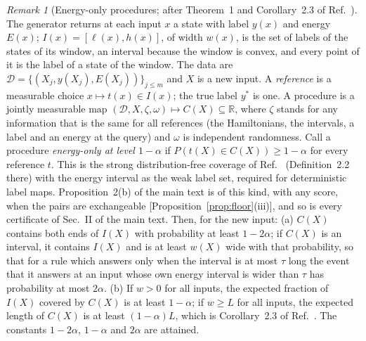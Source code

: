 \documentclass[aps,prx,onecolumn,10pt,nofootinbib,longbibliography,floatfix]{revtex4-2}
\theoremstyle{remark}
\newtheorem*{remark}{Remark}
\begin{document}
\begin{remark}[Energy-only procedures; after Theorem~1 and Corollary~2.3 of Ref.~\cite{cauchois2022}] %
\label{rem:anyproc}
The generator returns at each input $x$ a state with label $y(x)$ and energy $E(x)$; $I(x)=[\ell(x),h(x)]$, of width
$w(x)$, is the set of labels of the states of its window, an interval because the window is convex, and every point
of it is the label of a state of the window. The data are $\mathcal D=\{(X_j,y(X_j),E(X_j))\}_{j\le m}$ and $X$ is
a new input. A \emph{reference} is a measurable choice $x\mapsto t(x)\in I(x)$; the true label $y^*$ is one. A
procedure is a jointly measurable map $(\mathcal D,X,\zeta,\omega)\mapsto C(X)\subseteq\mathbb R$, where $\zeta$
stands for any information that is the same for all references (the Hamiltonians, the intervals, a label and an
energy at the query) and $\omega$ is independent randomness. Call a procedure \emph{energy-only at level
$1-\alpha$} if $P(t(X)\in C(X))\ge1-\alpha$ for every reference $t$. This is the strong distribution-free coverage
of Ref.~\cite{cauchois2022} (Definition~2.2 there) with the energy interval as the weak label set, required for %
deterministic label maps. Proposition~2(b) of the main text is of this kind, with any score, when the pairs are %
exchangeable [Proposition~\ref{prop:floor}(iii)], and so is every certificate of Sec.~II of the main text. Then,
for the new input:
(a) $C(X)$ contains both ends of $I(X)$ with probability at least $1-2\alpha$; if $C(X)$ is an interval, it
contains $I(X)$ and is at least $w(X)$ wide with that probability, so that for a rule which answers only when the
interval is at most $\tau$ long the event that it answers at an input whose own energy interval is wider than $\tau$
has probability at most $2\alpha$.
(b) If $w>0$ for all inputs, the expected fraction of $I(X)$ covered by $C(X)$ is at least $1-\alpha$; if $w\ge L$
for all inputs, the expected length of $C(X)$ is at least $(1-\alpha)L$, which is Corollary~2.3 of %
Ref.~\cite{cauchois2022}. The constants $1-2\alpha$, $1-\alpha$ and $2\alpha$ are attained.
\end{remark}
\end{document}
